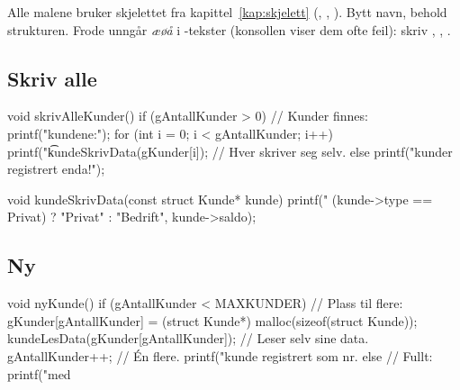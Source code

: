 

Alle malene bruker skjelettet fra kapittel~\ref{kap:skjelett} (, , ).
Bytt navn, behold strukturen. Frode unngår \emph{æøå} i -tekster (konsollen viser dem ofte feil): skriv , , .

\subsection{Skriv alle}\label{sec:skrivalle}
\begin{kode}
void skrivAlleKunder()  {
  if (gAntallKunder > 0)  {                        //  Kunder finnes:
     printf("\n\tAlle kundene:\n");
     for (int i = 0;  i < gAntallKunder;  i++)  {
         printf("\t%
         kundeSkrivData(gKunder[i]);                //  Hver skriver seg selv.
     }
  } else
     printf("\n\tIngen kunder registrert enda!\n");
}

void kundeSkrivData(const struct Kunde* kunde)  {
  printf("%
         (kunde->type == Privat) ? "Privat" : "Bedrift", kunde->saldo);
}
\end{kode}

\subsection{Ny}\label{sec:ny}
\begin{kode}
void nyKunde()  {
  if (gAntallKunder < MAXKUNDER)  {                //  Plass til flere:
     gKunder[gAntallKunder] = (struct Kunde*) malloc(sizeof(struct Kunde));
     kundeLesData(gKunder[gAntallKunder]);         //  Leser selv sine data.
     gAntallKunder++;                              //  Én flere.
     printf("\n\tNy kunde registrert som nr.%
  } else                                           //  Fullt:
     printf("\n\tFullt med %
}
\end{kode}

